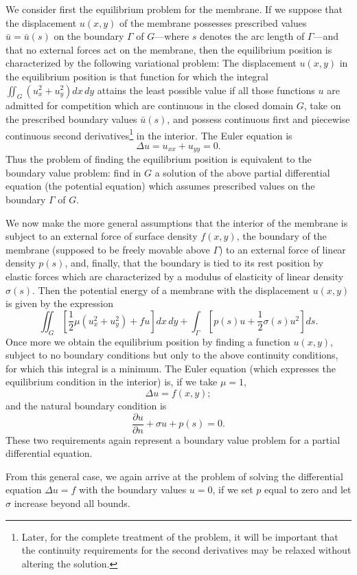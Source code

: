 We consider first the equilibrium problem for the membrane. If we suppose that the displacement $u(x,y)$ of the membrane possesses prescribed values $\bar u=\bar u(s)$ on the boundary $\Gamma$ of $G$---where $s$ denotes the arc length of $\Gamma$---and that no external forces act on the membrane, then the equilibrium position is characterized by the following variational problem: The displacement $u(x,y)$ in the equilibrium position is that function for which the integral $\iint_G(u_x^2+u_y^2)dx\,dy$ attains the least possible value if all those functions $u$ are admitted for competition which are continuous in the closed domain $G$, take on the prescribed boundary values $\bar u(s)$, and possess continuous first and piecewise continuous second derivatives\footnote{Later, for the complete treatment of the problem, it will be important that the continuity requirements for the second derivatives may be relaxed without altering the solution.} in the interior. The Euler equation is
\[
\Delta u=u_{xx}+u_{yy}=0.
\]
Thus the problem of finding the equilibrium position is equivalent to the boundary value problem: find in $G$ a solution of the above partial differential equation (the potential equation) which assumes prescribed values on the boundary $\Gamma$ of $G$.

We now make the more general assumptions that the interior of the membrane is subject to an external force of surface density $f(x,y)$, the boundary of the membrane (supposed to be freely movable above $\Gamma$) to an external force of linear density $p(s)$, and, finally, that the boundary is tied to its rest position by elastic forces which are characterized by a modulus of elasticity of linear density $\sigma(s)$. Then the potential energy of a membrane with the displacement $u(x,y)$ is given by the expression
\[
\iint_G\left[\frac12\mu(u_x^2+u_y^2)+fu\right]dx\,dy
+\int_\Gamma\left[p(s)u+\frac12\sigma(s)u^2\right]ds.
\]
Once more we obtain the equilibrium position by finding a function $u(x,y)$, subject to no boundary conditions but only to the above continuity conditions, for which this integral is a minimum. The Euler equation (which expresses the equilibrium condition in the interior) is, if we take $\mu=1$,
\[
\Delta u=f(x,y);
\]
and the natural boundary condition is
\[
\frac{\partial u}{\partial n}+\sigma u+p(s)=0.
\]
These two requirements again represent a boundary value problem for a partial differential equation.

From this general case, we again arrive at the problem of solving the differential equation $\Delta u=f$ with the boundary values $u=0$, if we set $p$ equal to zero and let $\sigma$ increase beyond all bounds.

